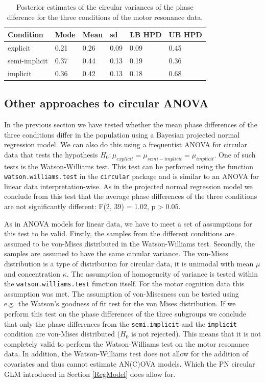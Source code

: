 \documentclass[11pt,]{article}
\begin{document}
\begin{table}
\centering
\caption{Posterior estimates of the circular variances of the phase diference for the three conditions of the motor resonance data.} 
\begin{tabular}{llllll}
  \hline\noalign{\smallskip}
Condition & Mode & Mean & sd & LB HPD & UB HPD\\ \hline\noalign{\smallskip}
explicit & 0.21 & 0.26 & 0.09 & 0.09 & 0.45\\
semi-implicit & 0.37 & 0.44 & 0.13 & 0.19 & 0.36\\
implicit & 0.36 & 0.42 & 0.13 & 0.18 & 0.68\\
   \hline
\end{tabular}
\label{TableresMRvar}
\end{table}

\subsection{Other approaches to circular ANOVA}\label{otheranova}

In the previous section we have tested whether the mean phase
differences of the three conditions differ in the population using a
Bayesian projected normal regression model. We can also do this using a
frequentist ANOVA for circular data that tests the hypothesis
\(H_0: \mu_{explicit} = \mu_{semi-implicit} = \mu_{implicit}\). One of
such tests is the Watson-Williams test. This test can be perfomed using
the function \verb|watson.williams.test| in the \verb|circular| package
and is similar to an ANOVA for linear data interpretation-wise. As in
the projected normal regression model we conclude from this test that
the average phase differences of the three conditions are not
significantly different: F(2, 39) = 1.02, p \textgreater{} 0.05.

As in ANOVA models for linear data, we have to meet a set of assumptions
for this test to be valid. Firstly, the samples from the different
conditions are assumed to be von-Mises distributed in the
Watson-Williams test. Secondly, the samples are assumed to have the same
circular variance. The von-Mises distribution is a type of distribution
for circular data, it is unimodal with mean \(\mu\) and concentration
\(\kappa\). The assumption of homogeneity of variance is tested within
the \verb|watson.williams.test| function itself. For the motor cognition
data this assumption was met. The assumption of von-Misesness can be
tested using e.g.~the Watson's goodness of fit test for the von Mises
distribution. If we perform this test on the phase differences of the
three subgroups we conclude that only the phase differences from the
\verb|semi.implicit| and the \verb|implicit| condition are von-Mises
distributed (\(H_0\) is not rejected). This means that it is not
completely valid to perform the Watson-Williams test on the motor
resonance data. In addition, the Watson-Williams test does not allow for
the addition of covariates and thus cannot estimate AN(C)OVA models.
Which the PN circular GLM introduced in Section \ref{RegModel} does
allow for.
\end{document}
